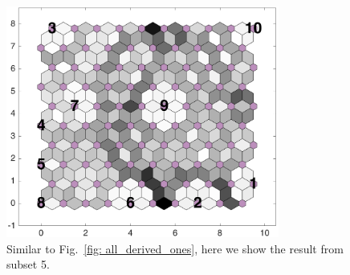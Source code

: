 \begin{figure}
        \centering
        \includegraphics[width=0.8\textwidth]{../../images0.01/M31/2D/image_subsets/subset3_dist_with_hits_t.png}
    \caption{Similar to Fig.~\ref{fig: all_derived_ones}, here we show the result from subset 5.}
    \label{fig: subset3}
\end{figure}